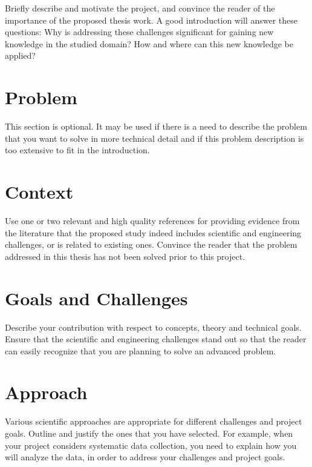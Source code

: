 \documentclass{article}
\begin{document}
Briefly describe and motivate the project, and convince the reader of the importance of the proposed thesis work.
A good introduction will answer these questions: Why is addressing these challenges significant for gaining new knowledge
in the studied domain? How and where can this new knowledge be applied?



\section{Problem}



This section is optional. It may be used if there is a need to describe the problem that you want to solve in more technical
detail and if this problem description is too extensive to fit in the introduction.




\section{Context}



Use one or two relevant and high quality references for providing evidence from the literature that the proposed study indeed
includes scientific and engineering challenges, or is related to existing ones. Convince the reader that the problem addressed
in this thesis has not been solved prior to this project.





\section{Goals and Challenges}



Describe your contribution with respect to concepts, theory and technical goals. Ensure that the scientific and engineering
challenges stand out so that the reader can easily recognize that you are planning to solve an advanced problem.


\section{Approach}



Various scientific approaches are appropriate for different challenges and project goals. Outline and justify the ones that
you have selected. For example, when your project considers systematic data collection, you need to explain how you will analyze
the data, in order to address your challenges and project goals.
\end{document}
